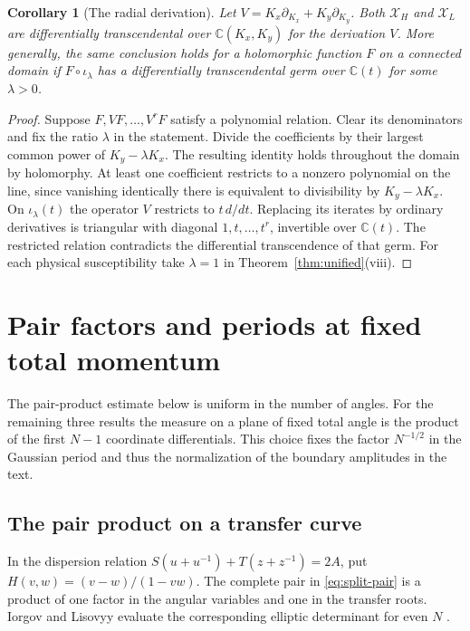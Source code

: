 \documentclass[11pt]{article}
\numberwithin{equation}{section}
\newtheorem{corollary}[theorem]{Corollary}
\theoremstyle{definition}
\newcommand{\C}{\mathbb C}
\begin{document}
\begin{corollary}[The radial derivation]\label{da:radial}
Let $V=K_x\partial_{K_x}+K_y\partial_{K_y}$. Both $\mathcal X_H$ and
$\mathcal X_L$ are differentially transcendental over $\C(K_x,K_y)$
for the derivation $V$. More generally, the same conclusion holds
for a holomorphic function $F$ on a connected domain if
$F\circ\iota_\lambda$ has a differentially transcendental germ over
$\C(t)$ for some $\lambda>0$.
\end{corollary}
\begin{proof}
Suppose $F,VF,\ldots,V^rF$ satisfy a polynomial relation. Clear its
denominators and fix the ratio $\lambda$ in the statement. Divide the coefficients by their
largest common power of $K_y-\lambda K_x$. The resulting identity
holds throughout the domain by holomorphy. At least one coefficient
restricts to a nonzero polynomial on the line, since vanishing
identically there is equivalent to divisibility by $K_y-\lambda K_x$.
On $\iota_\lambda(t)$ the operator $V$ restricts to $t\,d/dt$.
Replacing its iterates by ordinary derivatives is triangular with
diagonal $1,t,\ldots,t^r$, invertible over $\C(t)$. The restricted
relation contradicts the differential transcendence of that germ.
For each physical susceptibility take $\lambda=1$ in
Theorem~\ref{thm:unified}(viii).
\end{proof}

\appendix
\section{Pair factors and periods at fixed total momentum}\label{app:forms}

The pair-product estimate below is uniform in the number of angles.
For the remaining three results the measure on a plane of fixed total
angle is the product of the first $N-1$ coordinate differentials.
This choice fixes the factor $N^{-1/2}$ in the Gaussian period and thus
the normalization of the boundary amplitudes in the text.

\subsection{The pair product on a transfer curve}

In the dispersion relation $S(u+u^{-1})+T(z+z^{-1})=2A$,
put $H(v,w)=(v-w)/(1-vw)$. The complete pair in
\eqref{eq:split-pair} is a product of one factor in the angular
variables and one in the transfer roots. Iorgov and Lisovyy evaluate
the corresponding elliptic determinant for even $N$
\cite[(5.7)--(5.8), (6.4)]{IL}.
\end{document}
